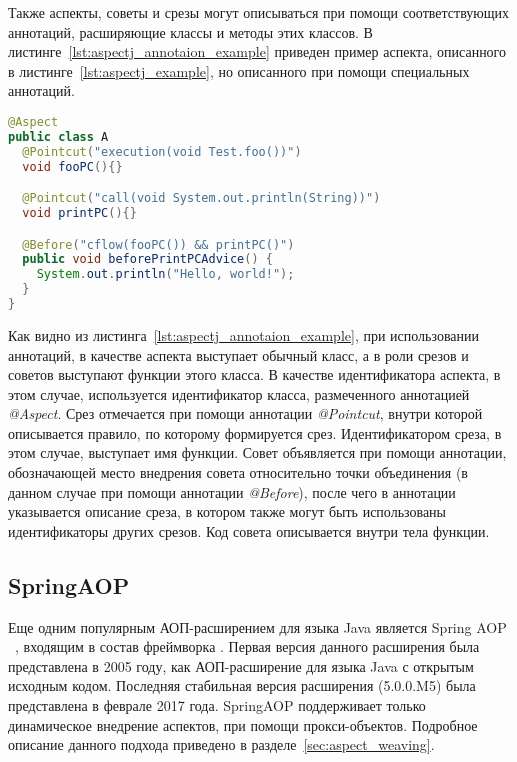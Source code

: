 Также аспекты, советы и срезы могут описываться при помощи соответствующих
аннотаций, расширяющие классы и методы этих классов.
В листинге~\ref{lst:aspectj_annotaion_example} приведен пример аспекта,
описанного в листинге~\ref{lst:aspectj_example}, но описанного при помощи
специальных аннотаций.
  \begin{lstlisting}[language=Java, label={lst:aspectj_annotaion_example}, 
  caption={Пример описания аспектов в AspectJ при помощи аннотаций}]
@Aspect
public class A
  @Pointcut("execution(void Test.foo())")
  void fooPC(){}

  @Pointcut("call(void System.out.println(String))")
  void printPC(){}

  @Before("cflow(fooPC()) && printPC()")
  public void beforePrintPCAdvice() {
    System.out.println("Hello, world!");
  }
}
\end{lstlisting}

Как видно из листинга~\ref{lst:aspectj_annotaion_example}, при использовании
аннотаций, в качестве аспекта выступает обычный класс, а в роли срезов и советов
выступают функции этого класса.
В качестве идентификатора аспекта, в этом случае, используется идентификатор
класса, размеченного аннотацией \textit{@Aspect}.
Срез отмечается при помощи аннотации \textit{@Pointcut}, внутри которой
описывается правило, по которому формируется срез.
Идентификатором среза, в этом случае, выступает имя функции.
Совет объявляется при помощи аннотации, обозначающей место внедрения совета
относительно точки объединения (в данном случае при помощи аннотации
\textit{@Before}), после чего в аннотации указывается описание среза, в котором
также могут быть использованы идентификаторы других срезов.
Код совета описывается внутри тела функции.

\subsection{SpringAOP}
\label{sub:spring_aop_overwiev}
Еще одним популярным АОП-расширением для языка Java является Spring AOP
~\cite{spring_aop}, входящим в состав фреймворка .
Первая версия данного расширения была представлена в 2005 году, как
АОП-расширение для языка Java с открытым исходным кодом.
Последняя стабильная версия расширения (5.0.0.M5) была представлена в феврале
2017 года.
SpringAOP поддерживает только динамическое внедрение аспектов, при помощи
прокси-объектов.
Подробное описание данного подхода приведено в разделе~\ref{sec:aspect_weaving}.

